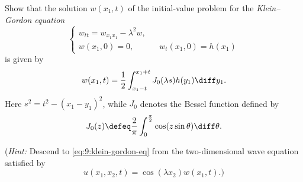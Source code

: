 \begin{problem}
  Show that the solution \(w(x_1,t)\) of the initial-value problem for the
  \emph{Klein--Gordon equation}
  \begin{equation}
    \label{eq:9:klein-gordon-eq}
    \left\{
      \begin{aligned}
        w_{tt}=w_{x_1x_1}-\lambda^2w,\\
        w(x_1,0)=0,&&w_t(x_1,0)=h(x_1)
      \end{aligned}
    \right.
  \end{equation}
  is given by
  \[
    w(x_1,t)=\frac{1}{2}\int_{x_1-t}^{x_1+t}J_0(\lambda s) h(y_1)\diff y_1.
  \]
  Here \(s^2=t^2-(x_1-y_1)^2\), while \(J_0\) denotes the Bessel function
  defined by
  \[
    J_0(z)\defeq \frac{2}{\pi}\int_0^{\frac{\pi}{2}}\cos(z\sin\theta)\diff\theta.
  \]

  \noindent (\emph{Hint:} Descend to \eqref{eq:9:klein-gordon-eq} from the
  two-dimensional wave equation satisfied by
  \[
    u(x_1,x_2,t)=\cos(\lambda x_2)w(x_1,t).\text{)}
  \]
\end{problem}
